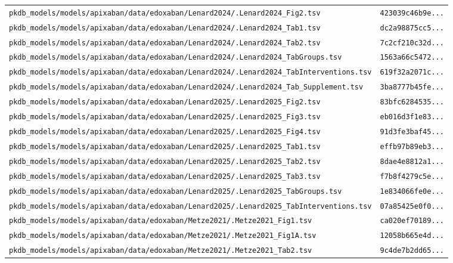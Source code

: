 \documentclass{article}
\begin{document}
\begin{longtable}{ll}
\texttt{pkdb\_models/models/apixaban/data/edoxaban/Lenard2024/.Lenard2024\_Fig2.tsv} & \texttt{423039c46b9e...} \\
\texttt{pkdb\_models/models/apixaban/data/edoxaban/Lenard2024/.Lenard2024\_Tab1.tsv} & \texttt{dc2a98875cc5...} \\
\texttt{pkdb\_models/models/apixaban/data/edoxaban/Lenard2024/.Lenard2024\_Tab2.tsv} & \texttt{7c2cf210c32d...} \\
\texttt{pkdb\_models/models/apixaban/data/edoxaban/Lenard2024/.Lenard2024\_TabGroups.tsv} & \texttt{1563a66c5472...} \\
\texttt{pkdb\_models/models/apixaban/data/edoxaban/Lenard2024/.Lenard2024\_TabInterventions.tsv} & \texttt{619f32a2071c...} \\
\texttt{pkdb\_models/models/apixaban/data/edoxaban/Lenard2024/.Lenard2024\_Tab\_Supplement.tsv} & \texttt{3ba8777b45fe...} \\
\texttt{pkdb\_models/models/apixaban/data/edoxaban/Lenard2025/.Lenard2025\_Fig2.tsv} & \texttt{83bfc6284535...} \\
\texttt{pkdb\_models/models/apixaban/data/edoxaban/Lenard2025/.Lenard2025\_Fig3.tsv} & \texttt{eb016d3f1e83...} \\
\texttt{pkdb\_models/models/apixaban/data/edoxaban/Lenard2025/.Lenard2025\_Fig4.tsv} & \texttt{91d3fe3baf45...} \\
\texttt{pkdb\_models/models/apixaban/data/edoxaban/Lenard2025/.Lenard2025\_Tab1.tsv} & \texttt{effb97b89eb3...} \\
\texttt{pkdb\_models/models/apixaban/data/edoxaban/Lenard2025/.Lenard2025\_Tab2.tsv} & \texttt{8dae4e8812a1...} \\
\texttt{pkdb\_models/models/apixaban/data/edoxaban/Lenard2025/.Lenard2025\_Tab3.tsv} & \texttt{f7b8f4279c5e...} \\
\texttt{pkdb\_models/models/apixaban/data/edoxaban/Lenard2025/.Lenard2025\_TabGroups.tsv} & \texttt{1e834066fe0e...} \\
\texttt{pkdb\_models/models/apixaban/data/edoxaban/Lenard2025/.Lenard2025\_TabInterventions.tsv} & \texttt{07a85425e0f0...} \\
\texttt{pkdb\_models/models/apixaban/data/edoxaban/Metze2021/.Metze2021\_Fig1.tsv} & \texttt{ca020ef70189...} \\
\texttt{pkdb\_models/models/apixaban/data/edoxaban/Metze2021/.Metze2021\_Fig1A.tsv} & \texttt{12058b665e4d...} \\
\texttt{pkdb\_models/models/apixaban/data/edoxaban/Metze2021/.Metze2021\_Tab2.tsv} & \texttt{9c4de7b2dd65...} \\

\end{longtable}
\end{document}
